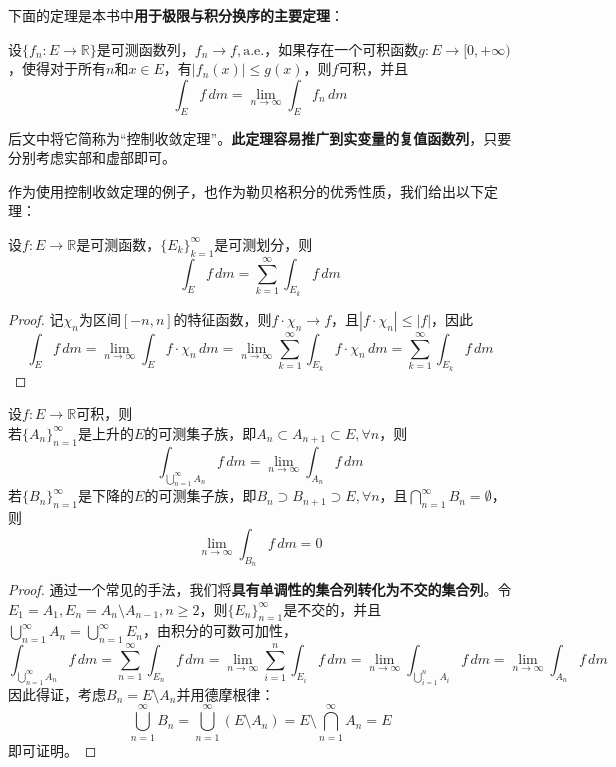 \documentclass{ctexbook}
\begin{document}
下面的定理是本书中\textbf{用于极限与积分换序的主要定理}：
\begin{theorem}[Lebesgue控制收敛定理]
    设$\{f_n:E\to\mathbb{R}\}$是可测函数列，$f_n\to f,\text{a.e.}$，如果存在一个可积函数$g:E\to[0,+\infty)$，使得对于所有$n$和$x\in E$，有$|f_n(x)|\leq g(x)$，则$f$可积，并且
    \[\int_{E}f\,dm=\lim_{n\to\infty}\int_{E}f_n\,dm\]
\end{theorem}

后文中将它简称为“控制收敛定理”。\textbf{此定理容易推广到实变量的复值函数列}，只要分别考虑实部和虚部即可。

作为使用控制收敛定理的例子，也作为勒贝格积分的优秀性质，我们给出以下定理：
\begin{theorem}[勒贝格积分的可数可加性]
    设$f:E\to\mathbb{R}$是可测函数，$\{E_k\}_{k=1}^{\infty}$是可测划分，则
    \[\int_{E}f\,dm=\sum_{k=1}^{\infty}\int_{E_k}f\,dm\]
\end{theorem}
\begin{proof}
    记$\chi_n$为区间$[-n,n]$的特征函数，则$f\cdot\chi_n\to f$，且$|f\cdot\chi_n|\leq |f|$，因此
    \[\int_{E}f\,dm=\lim_{n\to\infty}\int_{E}f\cdot\chi_n\,dm=\lim_{n\to\infty}\sum_{k=1}^{\infty}\int_{E_k}f\cdot\chi_n\,dm=\sum_{k=1}^{\infty}\int_{E_k}f\,dm\]
\end{proof}
\begin{corollary}
    设$f:E\to\mathbb{R}$可积，则\\
    若$\{A_n\}_{n=1}^{\infty}$是上升的$E$的可测集子族，即$A_n\subset A_{n+1}\subset E,\forall n$，则
    \[\int_{\bigcup_{n=1}^{\infty}A_n}f\,dm=\lim_{n\to\infty}\int_{A_n}f\,dm\]
    若$\{B_n\}_{n=1}^{\infty}$是下降的$E$的可测集子族，即$B_n\supset B_{n+1}\supset E,\forall n$，且$\bigcap_{n=1}^{\infty}B_n=\emptyset$，则
    \[\lim_{n\to\infty}\int_{B_n}f\,dm=0\]
\end{corollary}
\begin{proof}
通过一个常见的手法，我们将\textbf{具有单调性的集合列转化为不交的集合列}。令$E_1=A_1,E_n=A_n\setminus A_{n-1},n\geq 2$，则$\{E_n\}_{n=1}^{\infty}$是不交的，并且$\bigcup_{n=1}^{\infty}A_n=\bigcup_{n=1}^{\infty}E_n$，由积分的可数可加性，
\[\int_{\bigcup_{n=1}^{\infty}A_n}f\,dm=\sum_{n=1}^{\infty}\int_{E_n}f\,dm=\lim_{n\to\infty}\sum_{i=1}^{n}\int_{E_i}f\,dm=\lim_{n\to\infty}\int_{\bigcup_{i=1}^{n}A_i}f\,dm=\lim_{n\to\infty}\int_{A_n}f\,dm\]
因此得证，考虑$B_n=E\setminus A_n$并用德摩根律：
\[\bigcup_{n=1}^{\infty}B_n=\bigcup_{n=1}^{\infty}(E\setminus A_n)=E\setminus \bigcap_{n=1}^{\infty}A_n=E\]
即可证明。
\end{proof}
\end{document}
